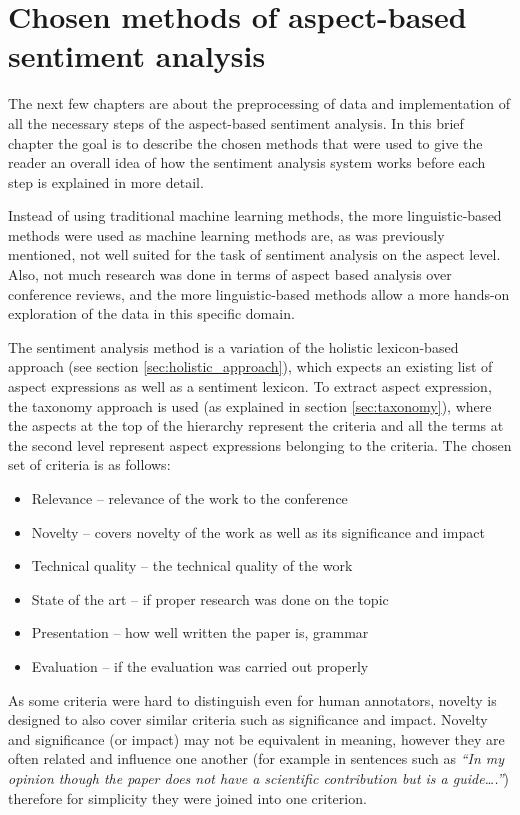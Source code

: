 \chapter{Chosen methods of aspect-based sentiment analysis}
\label{sec:chosen_methods}
The next few chapters are about the preprocessing of data and implementation of all the necessary steps of the aspect-based sentiment analysis. In this brief chapter the goal is to describe the chosen methods that were used to give the reader an overall idea of how the sentiment analysis system works before each step is explained in more detail.

Instead of using traditional machine learning methods, the more linguistic-based methods were used as machine learning methods are, as was previously mentioned, not well suited for the task of sentiment analysis on the aspect level. Also, not much research was done in terms of aspect based analysis over conference reviews, and the more linguistic-based methods allow a more hands-on exploration of the data in this specific domain.

The sentiment analysis method is a variation of the holistic lexicon-based approach (see section \ref{sec:holistic_approach}), which expects an existing list of aspect expressions as well as a sentiment lexicon. To extract aspect expression, the taxonomy approach is used (as explained in section \ref{sec:taxonomy}), where the aspects at the top of the hierarchy represent the criteria and all the terms at the second level represent aspect expressions belonging to the criteria. The chosen set of criteria is as follows:
\begin{itemize}
\item Relevance -- relevance of the work to the conference
\item Novelty -- covers novelty of the work as well as its significance and impact
\item Technical quality -- the technical quality of the work
\item State of the art -- if proper research was done on the topic 
\item Presentation -- how well written the paper is, grammar
\item Evaluation -- if the evaluation was carried out properly
\end{itemize}

As some criteria were hard to distinguish even for human annotators, novelty is designed to also cover similar criteria such as significance and impact. Novelty and significance (or impact) may not be equivalent in meaning, however they are often related and influence one another (for example in sentences such as \textit{``In my opinion though the paper does not have a scientific contribution but is a guide\ldots.''}) therefore for simplicity they were joined into one criterion.  

